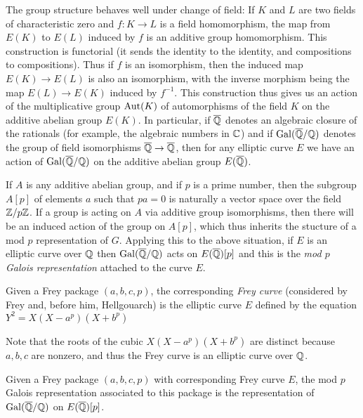 The group structure behaves well under change of field: If $K$ and $L$ are two fields of characteristic zero and $f:K\to L$ is a field homomorphism, the map from $E(K)$ to $E(L)$ induced by $f$ is an additive group homomorphism. This construction is functorial (it sends the identity to the identity,
and compositions to compositions). Thus if $f$ is an isomorphism, then the induced map $E(K)\to E(L)$ is
also an isomorphism, with the inverse morphism being the map $E(L)\to E(K)$ induced by $f^{-1}$. This construction
thus gives us an action of the multiplicative group $\operatorname{Aut}(K)$ of automorphisms of the field
$K$ on the additive abelian group $E(K)$. In particular, if $\overline{\mathbb{Q}}$ denotes an algebraic closure of the rationals (for example, the algebraic numbers in $\mathbb{C}$) and if $\operatorname{Gal}(\overline{\mathbb{Q}}/\mathbb{Q})$ denotes the group of field isomorphisms $\overline{\mathbb{Q}}\to\overline{\mathbb{Q}}$, then for any elliptic curve $E$ we have an action of $\operatorname{Gal}(\overline{\mathbb{Q}}/\mathbb{Q})$ on the additive abelian group $E(\overline{\mathbb{Q}})$.

If $A$ is any additive abelian group, and if $p$ is a prime number, then the subgroup $A[p]$ of elements $a$ such that $pa=0$ is naturally a vector space over the field $\mathbb{Z}/p\mathbb{Z}$. If a group is acting on $A$ via additive group isomorphisms, then there will be an induced action of the group on $A[p]$, which thus inherits the stucture of a mod $p$ representation of $G$. Applying this to the above situation,
if $E$ is an elliptic curve over $\mathbb{Q}$ then $\operatorname{Gal}(\overline{\mathbb{Q}}/\mathbb{Q})$ acts on $E(\overline{\mathbb{Q}})[p]$ and this is the \emph{mod $p$ Galois representation} attached to
the curve $E$.

\begin{definition}[Frey]\label{Frey_curve} Given a Frey package $(a,b,c,p)$, the corresponding \emph{Frey curve} (considered by Frey and, before him, Hellgouarch) is the elliptic curve $E$ defined by the equation $Y^2=X(X-a^p)(X+b^p)$\end{definition}

Note that the roots of the cubic $X(X-a^p)(X+b^p)$ are distinct because $a,b,c$ are nonzero, and thus the Frey curve is an
elliptic curve over $\mathbb{Q}$.

\begin{definition}\label{Frey_mod_p_Galois_representation} Given a Frey package $(a,b,c,p)$ with corresponding Frey curve $E$, the mod $p$ Galois representation associated to this package is the representation of $\operatorname{Gal}(\overline{\mathbb{Q}}/\mathbb{Q})$ on $E(\overline{\mathbb{Q}})[p]$.\end{definition}

